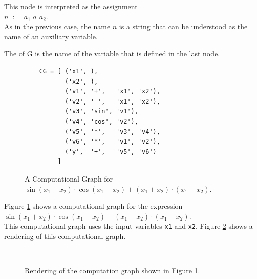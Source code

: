 \begin{Definition}
\begin{enumerate}
        This node is interpreted as the assignment
        \\[0.2cm]
        \hspace*{1.3cm}
        $n \;\mathtt{:=}\; a_1\; o\,\; a_2$.
        \\[0.2cm]
        As in the previous case, the name $n$ is a string that can be understood as the name of an auxiliary
        variable.
\end{enumerate}
The  of G is the name of the variable that is defined in the last node.
\eoxs
\end{Definition}

\begin{figure}[!ht]
\centering
\begin{verbatim}
    CG = [ ('x1', ),
           ('x2', ),
           ('v1', '+',   'x1', 'x2'),
           ('v2', '-',   'x1', 'x2'),
           ('v3', 'sin', 'v1'),
           ('v4', 'cos', 'v2'),
           ('v5', '*',   'v3', 'v4'),
           ('v6', '*',   'v1', 'v2'),
           ('y',  '+',   'v5', 'v6')
         ]
\end{verbatim}
\vspace*{-0.3cm}
\caption{A Computational Graph for $\sin(x_1 + x_2) \cdot \cos(x_1 - x_2) + (x_1 + x_2) \cdot (x_1 - x_2)$.}
\label{fig:computational-graph}
\end{figure}
\example
Figure \ref{fig:computational-graph} shows a computational graph for the expression
\\[0.2cm]
\hspace*{1.3cm}
$\sin(x_1 + x_2) \cdot \cos(x_1 - x_2) + (x_1 + x_2) \cdot (x_1 - x_2)$.
\\[0.2cm]
This computational graph uses the input variables \texttt{x1} and \texttt{x2}.
Figure \ref{fig:cg.eps} shows a rendering of this computational graph. \eoxs

\begin{figure}[!ht]
\centering
{} \
\vspace*{-0.3cm}
\caption{Rendering of the computation graph shown in Figure \ref{fig:computational-graph}.}
\label{fig:cg.eps}
\end{figure}

